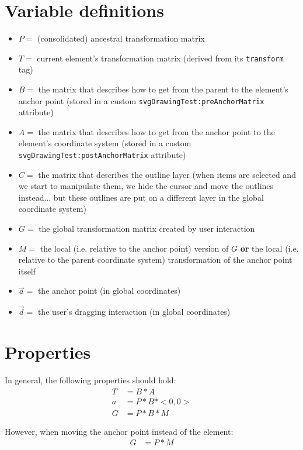 \documentclass[12pt]{article}
\begin{document}
\section{Variable definitions}

\begin{itemize}
\item $P=$ (consolidated) ancestral transformation matrix
\item $T=$ current element's transformation matrix (derived from its \texttt{transform} tag)
\item $B=$ the matrix that describes how to get from the parent to the element's anchor point (stored in a custom \texttt{svgDrawingTest:preAnchorMatrix} attribute)
\item $A=$ the matrix that describes how to get from the anchor point to the element's coordinate system (stored in a custom \texttt{svgDrawingTest:postAnchorMatrix} attribute)
\item $C=$ the matrix that describes the outline layer (when items are selected and we start to manipulate them, we hide the cursor and move the outlines instead... but these outlines are put on a different layer in the global coordinate system)
\item $G=$ the global transformation matrix created by user interaction
\item $M=$ the local (i.e. relative to the anchor point) version of $G$ \textbf{or} the local (i.e. relative to the parent coordinate system) transformation of the anchor point itself
\item $\vec a=$ the anchor point (in global coordinates)
\item $\vec d=$ the user's dragging interaction (in global coordinates)
\end{itemize}

\section{Properties}

In general, the following properties should hold:
\begin{align}
 T &= B * A \\
 a &= P * B * <0,0> \\
 G &= P * B * M
\end{align}

However, when moving the anchor point instead of the element:
\begin{align}
 G &= P * M
\end{align}
\end{document}

